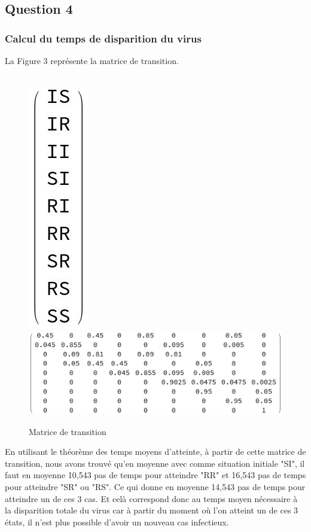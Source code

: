 \documentclass[a4paper, 11pt, oneside]{article}
\begin{document}
\subsection{Question 4}
\subsubsection{Calcul du temps de disparition du virus}
La Figure 3 représente la matrice de transition.

\begin{figure}[h]
    \centering
    \\
    \includegraphics[scale=0.5]{ordre_matrice_transitionQ4.jpg}
    \includegraphics[scale=0.5]{matriceTansition_Q4.jpg}
    \caption{Matrice de transition}
\end{figure}
En utilisant le théorème des temps moyens d'atteinte, à partir de cette 
matrice de transition, nous avons trouvé qu'en moyenne avec comme situation initiale 
"SI", il faut en moyenne 10,543 pas de temps pour atteindre "RR" et 16,543 pas 
de temps pour atteindre "SR" ou "RS". Ce qui donne en moyenne 14,543 pas de temps pour atteindre 
un de ces 3 cas. Et celà correspond donc au temps moyen nécessaire à la disparition  totale du virus car 
à partir du moment où l'on atteint un de ces 3 états, il n'est plus possible d'avoir un nouveau cas 
infectieux.
\end{document}
